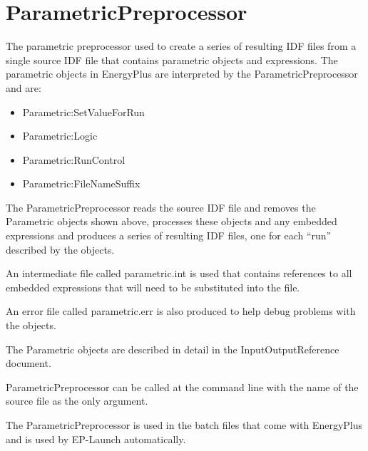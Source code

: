 \chapter{ParametricPreprocessor}\label{parametricpreprocessor}

The parametric preprocessor used to create a series of resulting IDF files from a single source IDF file that contains parametric objects and expressions. The parametric objects in EnergyPlus are interpreted by the ParametricPreprocessor and are:

\begin{itemize}
\tightlist
\item
  Parametric:SetValueForRun
\item
  Parametric:Logic
\item
  Parametric:RunControl
\item
  Parametric:FileNameSuffix
\end{itemize}

The ParametricPreprocessor reads the source IDF file and removes the Parametric objects shown above, processes these objects and any embedded expressions and produces a series of resulting IDF files, one for each ``run'' described by the objects.

An intermediate file called parametric.int is used that contains references to all embedded expressions that will need to be substituted into the file.

An error file called parametric.err is also produced to help debug problems with the objects.

The Parametric objects are described in detail in the InputOutputReference document.

ParametricPreprocessor can be called at the command line with the name of the source file as the only argument.

The ParametricPreprocessor is used in the batch files that come with EnergyPlus and is used by EP-Launch automatically.
